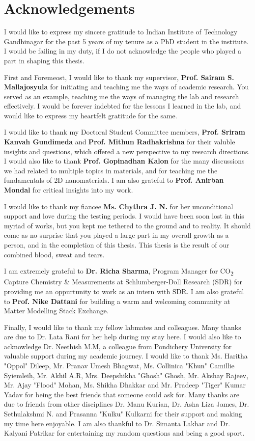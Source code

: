 \chapter*{Acknowledgements}
\justifying
I would like to express my sincere gratitude to Indian Institute of Technology Gandhinagar for the past 5 years of my tenure as a PhD student in the institute. I would be failing in my duty, if I do not acknowledge the people who played a part in shaping this thesis.

First and Foremeost, I would like to thank my supervisor, \textbf{Prof. Sairam S. Mallajosyula} for initiating and teaching me the ways of academic research. You served as an example, teaching me the ways of managing the lab and research effectively. I would be forever indebted for the lessons I learned in the lab, and would like to express my heartfelt gratitude for the same.

I would like to thank my Doctoral Student Committee members, \textbf{Prof. Sriram Kanvah Gundimeda} and \textbf{Prof. Mithun Radhakrishna} for their valuble insights and questions, which offered a new perspective to my research directions. I would also like to thank \textbf{Prof. Gopinadhan Kalon} for the many discussions we had related to multiple topics in materials, and for teaching me the fundamentals of 2D nanomaterials. I am also grateful to \textbf{Prof. Anirban Mondal} for critical insights into my work.

I would like to thank my fiancee \textbf{Ms. Chythra J. N.} for her unconditional support and love during the testing periods. I would have been soon lost in this myriad of works, but you kept me tethered to the ground and to reality. It should come as no surprise that you played a large part in my overall growth as a person, and in the completion of this thesis. This thesis is the result of our combined blood, sweat and tears.

I am extremely grateful to \textbf{Dr. Richa Sharma}, Program Manager for CO\textsubscript{2} Capture Chemistry \& Measurements at Schlumberger-Doll Research (SDR) for providing me an oppurtunity to work as an intern with SDR. I am also grateful to \textbf{Prof. Nike Dattani} for building a warm and welcoming community at Matter Modelling Stack Exchange.

Finally, I would like to thank my fellow labmates and colleagues. Many thanks are due to Dr. Lata Rani for her help during my stay here. I would also like to acknowledge Dr. Neethish M.M, a colleague from Pondichery University for valuable support during my academic journey. I would like to thank Ms. Haritha "Oppol" Dileep, Mr. Pranav Umesh Bhagwat, Ms. Collinica "Khun" Camillie Syiemleih, Mr. Akhil A.R, Mrs. Deepshikha "Ghosh" Ghosh, Mr. Akshay Rajeev, Mr. Ajay "Flood" Mohan, Ms. Shikha Dhakkar and Mr. Pradeep "Tiger" Kumar Yadav for being the best friends that someone could ask for. Many thanks are due to friends from other disciplines Dr. Manu Kurian, Dr. Asha Liza James, Dr. Sethulakshmi N. and Prasanna "Kulku" Kulkarni for their support and making my time here enjoyable. I am also thankful to Dr. Simanta Lakhar and Dr. Kalyani Patrikar for entertaining my random questions and being a good sport.

